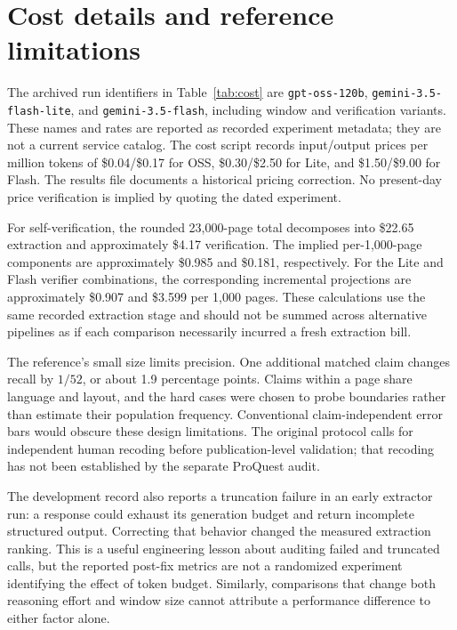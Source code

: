 \section{Cost details and reference limitations}\label{app:cost}
The archived run identifiers in Table~\ref{tab:cost} are \texttt{gpt-oss-120b}, \texttt{gemini-3.5-flash-lite}, and \texttt{gemini-3.5-flash}, including window and verification variants. These names and rates are reported as recorded experiment metadata; they are not a current service catalog. The cost script records input/output prices per million tokens of \$0.04/\$0.17 for OSS, \$0.30/\$2.50 for Lite, and \$1.50/\$9.00 for Flash. The results file documents a historical pricing correction. No present-day price verification is implied by quoting the dated experiment.

For self-verification, the rounded 23,000-page total decomposes into \$22.65 extraction and approximately \$4.17 verification. The implied per-1,000-page components are approximately \$0.985 and \$0.181, respectively. For the Lite and Flash verifier combinations, the corresponding incremental projections are approximately \$0.907 and \$3.599 per 1,000 pages. These calculations use the same recorded extraction stage and should not be summed across alternative pipelines as if each comparison necessarily incurred a fresh extraction bill.

The reference's small size limits precision. One additional matched claim changes recall by $1/52$, or about 1.9 percentage points. Claims within a page share language and layout, and the hard cases were chosen to probe boundaries rather than estimate their population frequency. Conventional claim-independent error bars would obscure these design limitations. The original protocol calls for independent human recoding before publication-level validation; that recoding has not been established by the separate ProQuest audit.

The development record also reports a truncation failure in an early extractor run: a response could exhaust its generation budget and return incomplete structured output. Correcting that behavior changed the measured extraction ranking. This is a useful engineering lesson about auditing failed and truncated calls, but the reported post-fix metrics are not a randomized experiment identifying the effect of token budget. Similarly, comparisons that change both reasoning effort and window size cannot attribute a performance difference to either factor alone.

